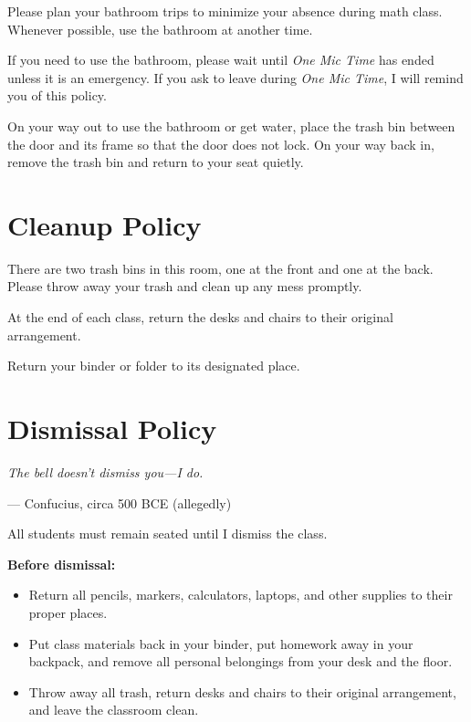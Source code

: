 \documentclass[10pt]{article}
\begin{document}
Please plan your bathroom trips to minimize your absence during math class. Whenever possible, use the bathroom at another time.

If you need to use the bathroom, please wait until \textit{One Mic Time} has ended unless it is an emergency. If you ask to leave during \textit{One Mic Time}, I will remind you of this policy.

On your way out to use the bathroom or get water, place the trash bin between the door and its frame so that the door does not lock. On your way back in, remove the trash bin and return to your seat quietly.

\section{Cleanup Policy}

There are two trash bins in this room, one at the front and one at the back. Please throw away your trash and clean up any mess promptly.

At the end of each class, return the desks and chairs to their original arrangement.

Return your binder or folder to its designated place.

\section{Dismissal Policy}

\begin{center}
    \textit{The bell doesn't dismiss you---I do.}

    \vspace{0.25em}
    --- Confucius, circa 500 BCE (allegedly)
\end{center}

All students must remain seated until I dismiss the class.

\textbf{Before dismissal:}
\begin{itemize}[label=$\bullet$]
    \item Return all pencils, markers, calculators, laptops, and other supplies to their proper places.
    \item Put class materials back in your binder, put homework away in your backpack, and remove all personal belongings from your desk and the floor.
    \item Throw away all trash, return desks and chairs to their original arrangement, and leave the classroom clean.
\end{itemize}
\end{document}
